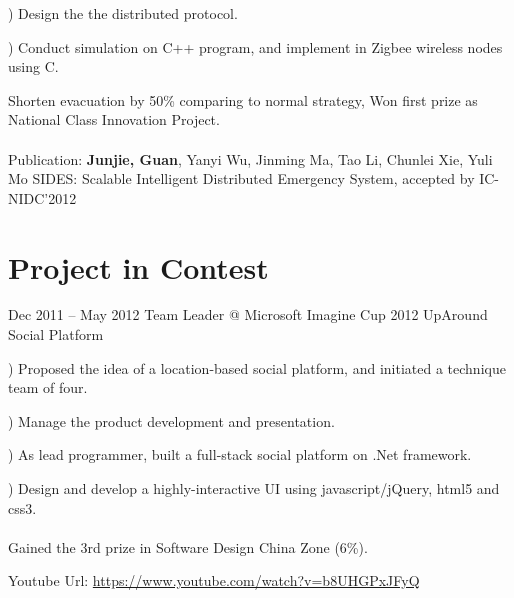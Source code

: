 \documentclass{tccv}
\begin{document}
\begin{eventlist}
     ) Design the the distributed protocol.
     
     ) Conduct simulation on C++ program, and implement in Zigbee wireless nodes using C.
     
Shorten evacuation by 50\% comparing to normal strategy, Won first prize as National Class Innovation Project.
\\\\
Publication: \textbf{Junjie, Guan}, Yanyi Wu, Jinming Ma, Tao Li, Chunlei Xie, Yuli Mo SIDES: Scalable Intelligent Distributed Emergency System, accepted by IC-NIDC’2012
     
\end{eventlist}





















\section{Project in Contest}
\begin{eventlist}

\item{Dec 2011 -- May 2012}
     {Team Leader @ Microsoft Imagine Cup 2012}
     {UpAround Social Platform}
     
     ) Proposed the idea of a location-based social platform, and initiated a technique team of four.
     
     ) Manage the product development and presentation.
     
     ) As lead programmer, built a full-stack social platform on .Net framework. 
     
     ) Design and develop a highly-interactive UI using javascript/jQuery, html5 and css3.
     \\\\
Gained the 3rd prize in Software Design China Zone (6\%).   

Youtube Url: \url{https://www.youtube.com/watch?v=b8UHGPxJFyQ}
       
\end{eventlist}
\end{document}
